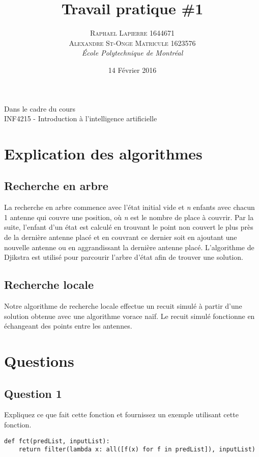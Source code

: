 \documentclass[a4paper, 12pt]{article} %
\title{Travail pratique \#1}
\author{\textsc{Raphael Lapierre 1644671\\
	        Alexandre St-Onge Matricule 1623576} %
\vspace{10pt}
\\{\textit{École Polytechnique de Montréal}}} %
\date{14 Février 2016} %
\makeatletter
\renewcommand{\maketitle}{ %
\begin{center} %

\vspace*{25pt} %
{\LARGE\@title} %

\vspace{125pt} %

{\large\@author} %

\vspace{125pt} %
Dans le cadre du cours
\\INF4215 - Introduction à l'intelligence artificielle
\vspace{125pt} %
\\\@date %
\vspace{125pt} %

\end{center}
}
\makeatother
\begin{document}
\thispagestyle{empty}
\clearpage\maketitle %
\pagebreak[4]

\setlength{\headheight}{15.0pt}
\pagestyle{fancy}
\fancyhead[C]{}

\section*{Explication des algorithmes}

\subsection*{Recherche en arbre}
La recherche en arbre commence avec l'état initial vide et \emph{n} enfants avec chacun 1 antenne qui couvre une position, où \emph{n} est le nombre de place à couvrir.
Par la suite, l'enfant d'un état est calculé en trouvant le point non couvert le plus près de la dernière antenne placé et en couvrant ce dernier soit en ajoutant une nouvelle 
antenne ou en aggrandissant la dernière antenne placé. L'algorithme de Djikstra est utilisé pour parcourir l'arbre d'état afin de trouver une solution.

\subsection*{Recherche locale}
Notre algorithme de recherche locale effectue un recuit simulé à partir d'une solution obtenue avec une algorithme vorace naïf. 
Le recuit simulé fonctionne en échangeant des points entre les antennes.

\section*{Questions}

\subsection*{Question 1}
Expliquez ce que fait cette fonction et fournissez un exemple utilisant cette fonction.
\begin{lstlisting}
def fct(predList, inputList):
	return filter(lambda x: all([f(x) for f in predList]), inputList)
\end{lstlisting}
\end{document}
